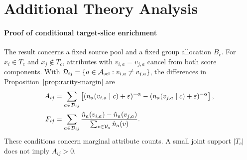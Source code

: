 \section{Additional Theory Analysis}
\label{app:theory-analysis}

\paragraph{Proof of conditional target-slice enrichment}
The result concerns a fixed source pool and a fixed group allocation $B_c$. For $x_i\in T_c$ and $x_j\notin T_c$, attributes with $v_{i,a}=v_{j,a}$ cancel from both score components. With $\mathcal{D}_{ij}=\{a\in\mathcal{A}_{\mathrm{sel}}:v_{i,a}\neq v_{j,a}\}$, the differences in Proposition~\ref{prop:rarity-margin} are
\begin{align}
A_{ij}
&=\sum_{a\in\mathcal{D}_{ij}}
\left[(n_a(v_{i,a}\mid c)+\varepsilon)^{-\alpha}
-(n_a(v_{j,a}\mid c)+\varepsilon)^{-\alpha}\right],\label{eq:rarity-advantage}\\
F_{ij}
&=\sum_{a\in\mathcal{D}_{ij}}
\frac{\hat n_a(v_{i,a})-\hat n_a(v_{j,a})}
{\sum_{v\in\mathcal{V}_a}\hat n_a(v)}.\label{eq:frequency-disadvantage}
\end{align}
These conditions concern marginal attribute counts. A small joint support $|T_c|$ does not imply $A_{ij}>0$.

